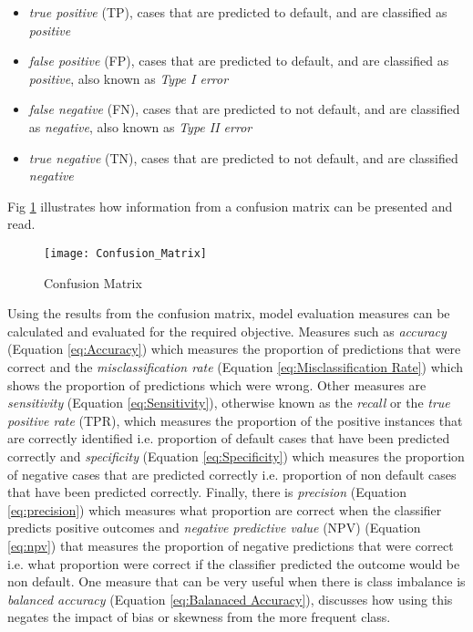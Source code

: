 \begin{itemize}
	\item \textit{true positive} (TP), cases that are predicted to default, and are {\color{green}{correctly}} classified as \textit{positive}
	\item \textit{false positive} (FP), cases that are predicted to default, and are {\color{red}{incorrectly}} classified as \textit{positive}, also known as \textit{Type I error}
	\item \textit{false negative} (FN), cases that are predicted to not default, and are {\color{red}{incorrectly}} classified as \textit{negative}, also known as \textit{Type II error}
	\item  \textit{true negative} (TN), cases that are predicted to not default, and are {\color{green}{correctly}} classified \textit{negative}
	
\end{itemize}

Fig \ref{fig:ConfusionMatrix} illustrates how information from a confusion matrix can be presented and read.

\begin{figure}[H]
	\texttt{[image: Confusion\_Matrix]}
	\caption[Confusion Matrix]
	{Confusion Matrix}
	\label{fig:ConfusionMatrix}
\end{figure}

Using the results from the confusion matrix, model evaluation measures can be calculated and evaluated for the required objective. Measures such as \textit{accuracy} (Equation \ref{eq:Accuracy}) which measures the proportion of predictions that were correct and the \textit{misclassification rate} (Equation \ref{eq:Misclassification Rate}) which shows the proportion of predictions which were wrong. Other measures are \textit{sensitivity} (Equation \ref{eq:Sensitivity}), otherwise known as the \textit{recall} or the \textit{true positive rate} (TPR), which measures the proportion of the positive instances that are correctly identified i.e. proportion of default cases that have been predicted correctly and \textit{specificity} (Equation \ref{eq:Specificity}) which measures the proportion of negative cases that are predicted correctly i.e. proportion of non default cases that have been predicted correctly. Finally, there is \textit{precision} (Equation \ref{eq:precision}) which measures what proportion are correct when the classifier predicts positive outcomes and \textit{negative predictive value} (NPV) (Equation \ref{eq:npv}) that measures the proportion of negative predictions that were correct i.e. what proportion were correct if the classifier predicted the outcome would be non default. One measure that can be very useful when there is class imbalance is \textit{balanced accuracy} (Equation \ref{eq:Balanaced Accuracy}), \citep{brodersen_balanced_2010} discusses how using this negates the impact of bias or skewness from the more frequent class.

